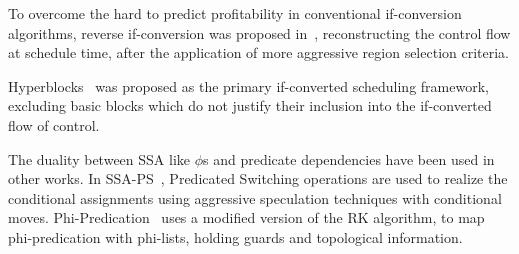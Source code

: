To overcome the hard to predict profitability in conventional if-conversion algorithms, reverse if-conversion was proposed in~\cite{August:1999:PRI:326224.325595}, reconstructing the control flow at schedule time, after the application of more aggressive region selection criteria.

Hyperblocks~\cite{Mahlke:1992:ECS:144965.144998} was proposed as the primary if-converted scheduling framework, excluding basic blocks which do not justify their inclusion into the if-converted flow of control.

The duality between SSA like $\phi$s and predicate dependencies have been used in other works. 
In SSA-PS~\cite{Jacome01clusteredvliw}, Predicated Switching operations are used to realize the conditional assignments using aggressive speculation techniques with conditional moves. 
Phi-Predication~\cite{Chuang03phi-predicationfor} uses a modified version of the RK algorithm, to map phi-predication with phi-lists, holding guards and topological information.












